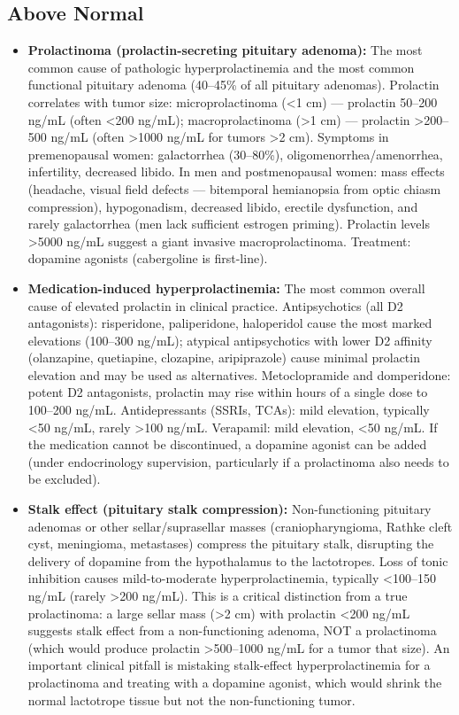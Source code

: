 \subsection*{Above Normal}
\begin{itemize}
  \item \textbf{Prolactinoma (prolactin-secreting pituitary adenoma):} The most common cause of pathologic hyperprolactinemia and the most common functional pituitary adenoma (40--45\% of all pituitary adenomas). Prolactin correlates with tumor size: microprolactinoma (<1 cm) --- prolactin 50--200 ng/mL (often <200 ng/mL); macroprolactinoma (>1 cm) --- prolactin >200--500 ng/mL (often >1000 ng/mL for tumors >2 cm). Symptoms in premenopausal women: galactorrhea (30--80\%), oligomenorrhea/amenorrhea, infertility, decreased libido. In men and postmenopausal women: mass effects (headache, visual field defects --- bitemporal hemianopsia from optic chiasm compression), hypogonadism, decreased libido, erectile dysfunction, and rarely galactorrhea (men lack sufficient estrogen priming). Prolactin levels >5000 ng/mL suggest a giant invasive macroprolactinoma. Treatment: dopamine agonists (cabergoline is first-line).
  \item \textbf{Medication-induced hyperprolactinemia:} The most common overall cause of elevated prolactin in clinical practice. Antipsychotics (all D2 antagonists): risperidone, paliperidone, haloperidol cause the most marked elevations (100--300 ng/mL); atypical antipsychotics with lower D2 affinity (olanzapine, quetiapine, clozapine, aripiprazole) cause minimal prolactin elevation and may be used as alternatives. Metoclopramide and domperidone: potent D2 antagonists, prolactin may rise within hours of a single dose to 100--200 ng/mL. Antidepressants (SSRIs, TCAs): mild elevation, typically <50 ng/mL, rarely >100 ng/mL. Verapamil: mild elevation, <50 ng/mL. If the medication cannot be discontinued, a dopamine agonist can be added (under endocrinology supervision, particularly if a prolactinoma also needs to be excluded).
  \item \textbf{Stalk effect (pituitary stalk compression):} Non-functioning pituitary adenomas or other sellar/suprasellar masses (craniopharyngioma, Rathke cleft cyst, meningioma, metastases) compress the pituitary stalk, disrupting the delivery of dopamine from the hypothalamus to the lactotropes. Loss of tonic inhibition causes mild-to-moderate hyperprolactinemia, typically <100--150 ng/mL (rarely >200 ng/mL). This is a critical distinction from a true prolactinoma: a large sellar mass (>2 cm) with prolactin <200 ng/mL suggests stalk effect from a non-functioning adenoma, NOT a prolactinoma (which would produce prolactin >500--1000 ng/mL for a tumor that size). An important clinical pitfall is mistaking stalk-effect hyperprolactinemia for a prolactinoma and treating with a dopamine agonist, which would shrink the normal lactotrope tissue but not the non-functioning tumor.

\end{itemize}
